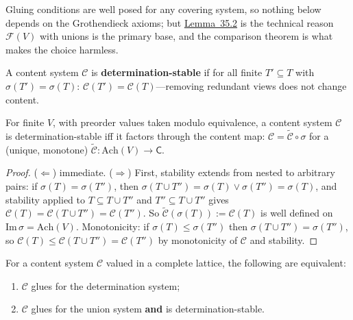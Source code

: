 Gluing conditions are well posed for any covering system, so nothing below depends on the Grothendieck axioms; but \hyperlink{stmt:35.2}{Lemma~35.2} is the technical reason \(\mathcal{F}(V)\) with unions is the primary base, and the comparison theorem is what makes the choice harmless.

\begin{thmdef}

A content system \(\mathcal{C}\) is \textbf{determination-stable} if for all finite \(T' \subseteq T\) with \(\sigma(T') = \sigma(T)\): \(\mathcal{C}(T') = \mathcal{C}(T)\)---\hspace{0pt}removing redundant views does not change content.
\end{thmdef}

\begin{thmplain}

For finite \(V\), with preorder values taken modulo equivalence, a content system \(\mathcal{C}\) is determination-stable iff it factors through the content map: \(\mathcal{C} = \widetilde{\mathcal{C}} \circ \sigma\) for a (unique, monotone) \(\widetilde{\mathcal{C}} : \mathrm{Ach}(V) \to \mathsf{C}\).
\end{thmplain}

\begin{proof}

(\(\Leftarrow\)) immediate. (\(\Rightarrow\)) First, stability extends from nested to arbitrary pairs: if \(\sigma(T) = \sigma(T'')\), then \(\sigma(T \cup T'') = \sigma(T) \vee \sigma(T'') = \sigma(T)\), and stability applied to \(T \subseteq T \cup T''\) and \(T'' \subseteq T \cup T''\) gives \(\mathcal{C}(T) = \mathcal{C}(T \cup T'') = \mathcal{C}(T'')\). So \(\widetilde{\mathcal{C}}(\sigma(T)) := \mathcal{C}(T)\) is well defined on \(\mathrm{Im}\,\sigma = \mathrm{Ach}(V)\). Monotonicity: if \(\sigma(T) \le \sigma(T'')\) then \(\sigma(T \cup T'') = \sigma(T'')\), so \(\mathcal{C}(T) \le \mathcal{C}(T \cup T'') = \mathcal{C}(T'')\) by monotonicity of \(\mathcal{C}\) and stability.
\end{proof}

\begin{thmplain}

For a content system \(\mathcal{C}\) valued in a complete lattice, the following are equivalent:

\begin{enumerate}
\def\labelenumi{\arabic{enumi}.}
\tightlist
\item
  \(\mathcal{C}\) glues for the determination system;
\item
  \(\mathcal{C}\) glues for the union system \textbf{and} is determination-stable.
\end{enumerate}
\end{thmplain}

